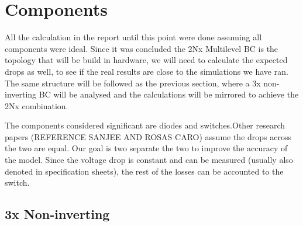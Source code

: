 \section{Components}\label{ch:CD}

All the calculation in the report until this point were done assuming all components were ideal. Since it was concluded the 2Nx Multilevel BC is the topology that will be build in hardware, we will need to calculate the expected drops as well, to see if the real results are close to the simulations we have ran. 
The same structure will be followed as the previous section, where a 3x non-inverting BC will be analysed and the calculations will be mirrored to achieve the 2Nx combination.

The components considered significant are diodes and switches.Other research papers (REFERENCE SANJEE AND ROSAS CARO) assume the drops across the two are equal. Our goal is two separate the two to improve the accuracy of the model. Since the voltage drop is constant and can be measured (usually also denoted in specification sheets), the rest of the losses can be accounted to the switch.

\subsection{3x Non-inverting}

